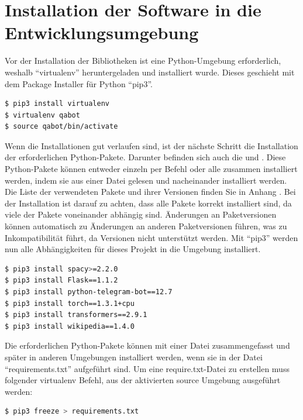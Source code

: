 \documentclass[
        ngerman,
        paper=a4,
        numbers=noendperiod,
]{scrreprt}
\begin{document}
\section{Installation der Software in die Entwicklungsumgebung}
Vor der Installation der Bibliotheken ist eine Python-Umgebung erforderlich, weshalb \enquote{virtualenv} heruntergeladen und installiert wurde. Dieses geschieht mit dem Package Installer für Python \enquote{pip3}.

\begin{lstlisting}[language=bash, caption=Einrichten der virtuellen Umgebung]
$ pip3 install virtualenv
$ virtualenv qabot
$ source qabot/bin/activate
\end{lstlisting}

Wenn die Installationen gut verlaufen sind, ist der nächste Schritt die Installation der erforderlichen Python-Pakete.
Darunter befinden sich auch die  und . Diese Python-Pakete können entweder einzeln per Befehl oder alle zusammen installiert werden, indem sie aus einer Datei gelesen und nacheinander installiert werden. Die Liste der verwendeten Pakete und ihrer Versionen finden Sie in Anhang . Bei der Installation ist darauf zu achten, dass alle Pakete korrekt installiert sind, da viele der Pakete voneinander abhängig sind. Änderungen an Paketversionen können automatisch zu Änderungen an anderen Paketversionen führen, was zu Inkompatibilität führt, da Versionen nicht unterstützt werden. 
Mit \enquote{pip3} werden nun alle Abhängigkeiten für dieses Projekt in die Umgebung installiert.


\begin{lstlisting}[language=bash, caption=Installieren der Abhängigkeiten mit pip3]
$ pip3 install spacy>=2.2.0
$ pip3 install Flask==1.1.2
$ pip3 install python-telegram-bot==12.7
$ pip3 install torch==1.3.1+cpu
$ pip3 install transformers==2.9.1
$ pip3 install wikipedia==1.4.0
\end{lstlisting}



Die erforderlichen Python-Pakete können mit einer Datei zusammengefasst und später in anderen Umgebungen installiert werden, wenn sie in der Datei \enquote{requirements.txt} aufgeführt sind. Um eine require.txt-Datei zu erstellen muss folgender virtualenv Befehl, aus der aktivierten source Umgebung ausgeführt werden:

\begin{lstlisting}[language=bash, caption=Erstellen der requirements.txt Datei]
$ pip3 freeze > requirements.txt
\end{lstlisting}
\end{document}

